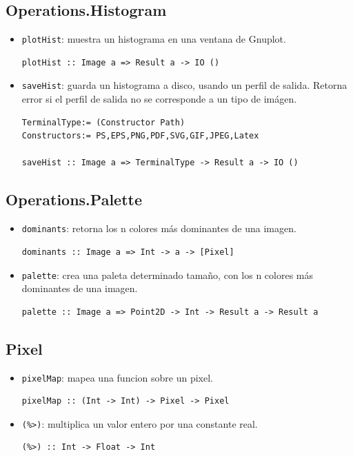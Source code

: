 \documentclass[a4paper, 11pt]{article} %
\begin{document}
\subsection*{Operations.Histogram}
	\begin{itemize} 
		\item \texttt{plotHist}: muestra un histograma en una ventana de Gnuplot.
\begin{lstlisting} 
plotHist :: Image a => Result a -> IO ()
\end{lstlisting}
		\item \texttt{saveHist}: guarda un histograma a disco, usando un perfil de salida. Retorna error si el perfil de salida no se corresponde a un tipo de imágen.
\begin{lstlisting}
TerminalType:= (Constructor Path)
Constructors:= PS,EPS,PNG,PDF,SVG,GIF,JPEG,Latex

saveHist :: Image a => TerminalType -> Result a -> IO ()
\end{lstlisting}
	\end{itemize}


\subsection*{Operations.Palette}
	\begin{itemize} 
		\item \texttt{dominants}: retorna los n colores más dominantes de una imagen.
\begin{lstlisting} 
dominants :: Image a => Int -> a -> [Pixel]
\end{lstlisting}
		\item \texttt{palette}: crea una paleta determinado tamaño, con los n colores más dominantes de una imagen.
\begin{lstlisting}
palette :: Image a => Point2D -> Int -> Result a -> Result a
\end{lstlisting}
	\end{itemize}
	
\subsection*{Pixel}
	\begin{itemize} 
		\item \texttt{pixelMap}: mapea una funcion sobre un pixel.
\begin{lstlisting}
pixelMap :: (Int -> Int) -> Pixel -> Pixel
\end{lstlisting}
		\item \texttt{(\%>)}: multiplica un valor entero por una constante real.
\begin{lstlisting} 
(%>) :: Int -> Float -> Int
\end{lstlisting}
	\end{itemize}
\end{document}
